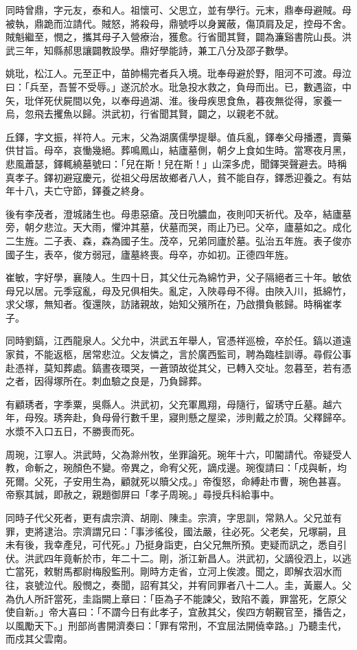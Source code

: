 \begin{pinyinscope}
同時曾鼎，字元友，泰和人。祖懷可、父思立，並有學行。元末，鼎奉母避賊。母被執，鼎跪而泣請代。賊怒，將殺母，鼎號呼以身翼蔽，傷頂肩及足，控母不舍。賊魁繼至，憫之，攜其母子入營療治，獲愈。行省聞其賢，闢為濂谿書院山長。洪武三年，知縣郝思讓闢教設學。鼎好學能詩，兼工八分及邵子數學。

姚玭，松江人。元至正中，苗帥楊完者兵入境。玭奉母避於野，阻河不可渡。母泣曰：「兵至，吾誓不受辱。」遂沉於水。玭急投水救之，負母而出。已，數遇盜，中矢，玭佯死伏屍間以免，以奉母過湖、淮。後母疾思食魚，暮夜無從得，家養一烏，忽飛去攫魚以歸。洪武初，行省聞其賢，闢之，以親老不就。

丘鐸，字文振，祥符人。元末，父為湖廣儒學提舉。值兵亂，鐸奉父母播遷，賣藥供甘旨。母卒，哀慟幾絕。葬鳴鳳山，結廬墓側，朝夕上食如生時。當寒夜月黑，悲風蕭瑟，鐸輒繞墓號曰：「兒在斯！兒在斯！」山深多虎，聞鐸哭聲避去。時稱真孝子。鐸初避寇慶元，從祖父母居故鄉者八人，貧不能自存，鐸悉迎養之。有姑年十八，夫亡守節，鐸養之終身。

後有李茂者，澄城諸生也。母患惡瘡。茂日吮膿血，夜則叩天祈代。及卒，結廬墓旁，朝夕悲泣。天大雨，懼沖其墓，伏墓而哭，雨止乃已。父卒，廬墓如之。成化二生旌。二子表、森，森為國子生。茂卒，兄弟同廬於墓。弘治五年旌。表子俊亦國子生，表卒，俊方弱冠，廬墓終喪。母卒，亦如初。正德四年旌。

崔敏，字好學，襄陵人。生四十日，其父仕元為綿竹尹，父子隔絕者三十年。敏依母兄以居。元季寇亂，母及兄俱相失。亂定，入陜尋母不得。由陜入川，抵綿竹，求父塚，無知者。復還陜，訪諸親故，始知父殯所在，乃啟攢負骸歸。時稱崔孝子。

同時劉鎬，江西龍泉人。父允中，洪武五年舉人，官憑祥巡檢，卒於任。鎬以道遠家貧，不能返柩，居常悲泣。父友憐之，言於廣西監司，聘為臨桂訓導。尋假公事赴憑祥，莫知葬處。鎬晝夜環哭，一蒼頭故從其父，已轉入交址。忽暮至，若有憑之者，因得塚所在。刺血驗之良是，乃負歸葬。

有顧琇者，字季粟，吳縣人。洪武初，父充軍鳳翔，母隨行，留琇守丘墓。越六年，母歿。琇奔赴，負母骨行數千里，寢則懸之屋梁，涉則戴之於頂。父釋歸卒。水漿不入口五日，不勝喪而死。

周琬，江寧人。洪武時，父為滁州牧，坐罪論死。琬年十六，叩閽請代。帝疑受人教，命斬之，琬顏色不變。帝異之，命宥父死，謫戍邊。琬復請曰：「戍與斬，均死爾。父死，子安用生為，顧就死以贖父戍。」帝復怒，命縛赴市曹，琬色甚喜。帝察其誠，即赦之，親題御屏曰「孝子周琬。」尋授兵科給事中。

同時子代父死者，更有虞宗濟、胡剛、陳圭。宗濟，字思訓，常熟人。父兄並有罪，吏將逮治。宗濟謂兄曰：「事涉徭役，國法嚴，往必死。父老矣，兄塚嗣，且未有後，我幸產兒，可代死。」乃挺身詣吏，白父兄無所預。吏疑而訊之，悉自引伏。洪武四年竟斬於市，年二十二。剛，浙江新昌人。洪武初，父謫役泗上，以逃亡當死，敕駙馬都尉梅殷監刑。剛時方走省，立河上俟渡。聞之，即解衣泅水而往，哀號泣代。殷憫之，奏聞，詔宥其父，并宥同罪者八十二人。圭，黃巖人。父為仇人所訐當死，圭詣闕上章曰：「臣為子不能諫父，致陷不義，罪當死，乞原父使自新。」帝大喜曰：「不謂今日有此孝子，宜赦其父，俟四方朝覲官至，播告之，以風勵天下。」刑部尚書開濟奏曰：「罪有常刑，不宜屈法開僥幸路。」乃聽圭代，而戍其父雲南。


\end{pinyinscope}

